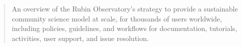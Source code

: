 
\begin{abstract}
An overview of the Rubin Observatory’s strategy to provide a sustainable community science model at scale, for thousands of users worldwide, including policies, guidelines, and workflows for documentation, tutorials, activities, user support, and issue resolution.
\end{abstract}

